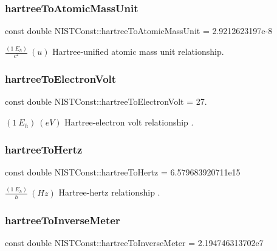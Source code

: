 \subsubsection{\texorpdfstring{hartree\+To\+Atomic\+Mass\+Unit}{hartreeToAtomicMassUnit}}
{\footnotesize\ttfamily const double N\+I\+S\+T\+Const\+::hartree\+To\+Atomic\+Mass\+Unit = 2.\+9212623197e-\/8}

$\frac{(1\ E_h)}{c^2} \ (u)$ Hartree-\/unified atomic mass unit relationship. \mbox{\label{group___hartree_ga225406ee0c3f44db3c49563e7dd253ce}} 
\subsubsection{\texorpdfstring{hartree\+To\+Electron\+Volt}{hartreeToElectronVolt}}
{\footnotesize\ttfamily const double N\+I\+S\+T\+Const\+::hartree\+To\+Electron\+Volt = 27.}

$(1\ E_h) \ (eV)$ Hartree-\/electron volt relationship . \mbox{\label{group___hartree_gaf2341e65d7aba07555272afe4a14345e}} 
\subsubsection{\texorpdfstring{hartree\+To\+Hertz}{hartreeToHertz}}
{\footnotesize\ttfamily const double N\+I\+S\+T\+Const\+::hartree\+To\+Hertz = 6.\+579683920711e15}

$\frac{(1\ E_h)}{h} \ (Hz)$ Hartree-\/hertz relationship . \mbox{\label{group___hartree_ga98d22d0957c639e03a8432aadd02f58f}} 
\subsubsection{\texorpdfstring{hartree\+To\+Inverse\+Meter}{hartreeToInverseMeter}}
{\footnotesize\ttfamily const double N\+I\+S\+T\+Const\+::hartree\+To\+Inverse\+Meter = 2.\+194746313702e7}

